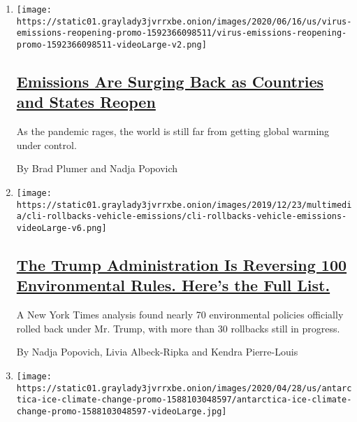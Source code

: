 \begin{enumerate}
\def\labelenumi{\arabic{enumi}.}
\item
  \texttt{[image: https://static01.graylady3jvrrxbe.onion/images/2020/06/16/us/virus-emissions-reopening-promo-1592366098511/virus-emissions-reopening-promo-1592366098511-videoLarge-v2.png]}

  \hypertarget{emissions-are-surging-back-as-countries-and-states-reopen}{%
  \subsection{\texorpdfstring{\href{/interactive/2020/06/17/climate/virus-emissions-reopening.html}{Emissions
  Are Surging Back as Countries and States
  Reopen}}{Emissions Are Surging Back as Countries and States Reopen}}\label{emissions-are-surging-back-as-countries-and-states-reopen}}

  As the pandemic rages, the world is still far from getting global
  warming under control.

  By Brad Plumer and Nadja Popovich
\item
  \texttt{[image: https://static01.graylady3jvrrxbe.onion/images/2019/12/23/multimedia/cli-rollbacks-vehicle-emissions/cli-rollbacks-vehicle-emissions-videoLarge-v6.png]}

  \hypertarget{the-trump-administration-is-reversing-100-environmental-rules-heres-the-full-list}{%
  \subsection{\texorpdfstring{\href{/interactive/2020/climate/trump-environment-rollbacks.html}{The
  Trump Administration Is Reversing 100 Environmental Rules. Here's the
  Full
  List.}}{The Trump Administration Is Reversing 100 Environmental Rules. Here's the Full List.}}\label{the-trump-administration-is-reversing-100-environmental-rules-heres-the-full-list}}

  A New York Times analysis found nearly 70 environmental policies
  officially rolled back under Mr. Trump, with more than 30 rollbacks
  still in progress.

  By Nadja Popovich, Livia Albeck-Ripka and Kendra Pierre-Louis
\item
  \texttt{[image: https://static01.graylady3jvrrxbe.onion/images/2020/04/28/us/antarctica-ice-climate-change-promo-1588103048597/antarctica-ice-climate-change-promo-1588103048597-videoLarge.jpg]}

  \hypertarget{a-satellite-lets-scientists-see-antarcticas-melting-like-never-before}{%
}
\end{enumerate}
